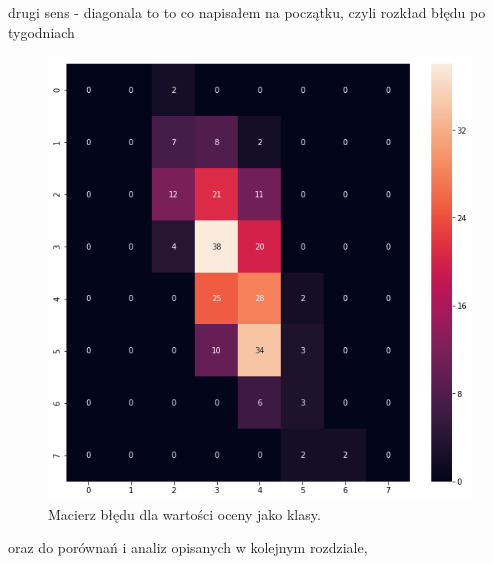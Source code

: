 drugi sens - diagonala to to co napisałem na początku, czyli rozkład błędu po tygodniach

\begin{figure}[t!]
	\centering
	\includegraphics[width=1\textwidth]{figures/cmScores.png}
	\caption{Macierz błędu dla wartości oceny jako klasy.}\label{fig:cmscores}
\end{figure}
oraz do porównań i analiz opisanych w kolejnym rozdziale,